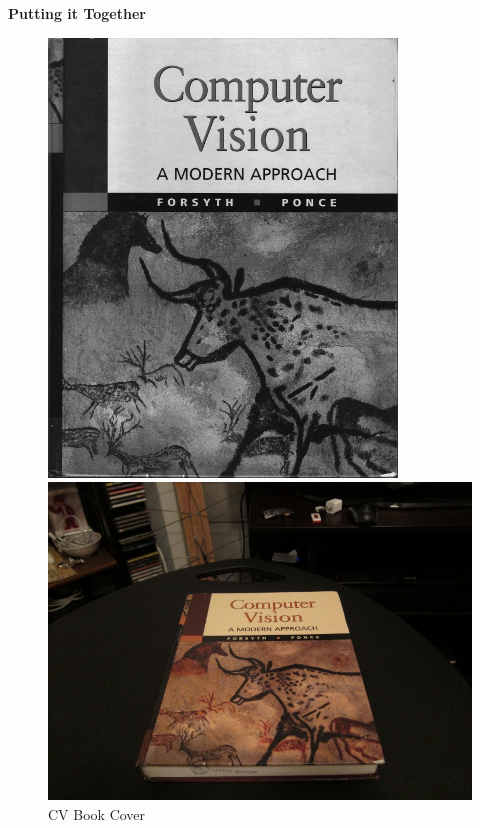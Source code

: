 \newpage
\begin{problem}[9]
\textbf{Putting it Together} \\

\begin{figure}[H]
  \centering
  \begin{minipage}{0.51\textwidth}
    \includegraphics[width=\textwidth]{images/cv_cover.jpg}
    \caption{CV Book Cover}
    \label{fig:cv-cover}
  \end{minipage}
  \hfill
  \begin{minipage}{0.49\textwidth}
    \includegraphics[width=\textwidth]{images/cv_desk.png}

\end{minipage}
\end{figure}
\end{problem}
